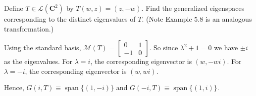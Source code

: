 Define $T \in\mathcal{L}(\mathbf{C}^2)$ by $T(w,z) = (z,-w)$. Find the generalized eigenspaces corresponding to the distinct eigenvalues of $T$. (Note Example 5.8 is an analogous transformation.)

\soln* Using the standard basis, $\mathcal{M}(T) = \begin{bmatrix}
    0 & 1 \\ -1 & 0
\end{bmatrix}$. So since $\lambda^2 + 1 = 0$ we have $\pm i$ as the eigenvalues. For $\lambda = i$, the corresponding eigenvector is $(w, -wi)$. For $\lambda = -i$, the corresponding eigenvector is $(w,wi)$. 

\nl Hence, $G(i, T) \equiv \operatorname{span}\{(1, -i)\}$ and $G(-i, T) \equiv \operatorname{span}\{(1, i)\}$.